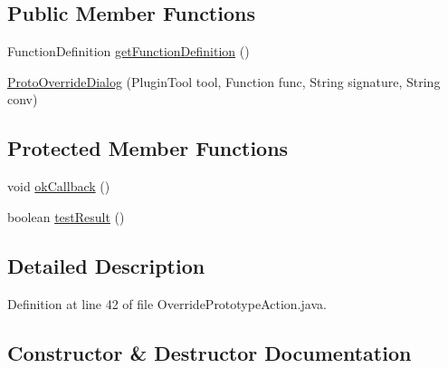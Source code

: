 \subsection*{Public Member Functions}
\begin{DoxyCompactItemize}
\item 
Function\+Definition \mbox{\hyperlink{classghidra_1_1app_1_1plugin_1_1core_1_1decompile_1_1actions_1_1_override_prototype_action_1_1_proto_override_dialog_a00d5c5714668d6a38bbc1059a2f3fd4d}{get\+Function\+Definition}} ()
\item 
\mbox{\hyperlink{classghidra_1_1app_1_1plugin_1_1core_1_1decompile_1_1actions_1_1_override_prototype_action_1_1_proto_override_dialog_abf35a6774e2de9402a22d3b5d7cbbf61}{Proto\+Override\+Dialog}} (Plugin\+Tool tool, Function func, String signature, String conv)
\end{DoxyCompactItemize}
\subsection*{Protected Member Functions}
\begin{DoxyCompactItemize}
\item 
void \mbox{\hyperlink{classghidra_1_1app_1_1plugin_1_1core_1_1decompile_1_1actions_1_1_override_prototype_action_1_1_proto_override_dialog_aaf58728fc063b0a5129eb42f007ff6c1}{ok\+Callback}} ()
\item 
boolean \mbox{\hyperlink{classghidra_1_1app_1_1plugin_1_1core_1_1decompile_1_1actions_1_1_override_prototype_action_1_1_proto_override_dialog_a068e14fd3b4928c457ad0687c64ebf5f}{test\+Result}} ()
\end{DoxyCompactItemize}


\subsection{Detailed Description}


Definition at line 42 of file Override\+Prototype\+Action.\+java.



\subsection{Constructor \& Destructor Documentation}
\mbox{\label{classghidra_1_1app_1_1plugin_1_1core_1_1decompile_1_1actions_1_1_override_prototype_action_1_1_proto_override_dialog_abf35a6774e2de9402a22d3b5d7cbbf61}} 
